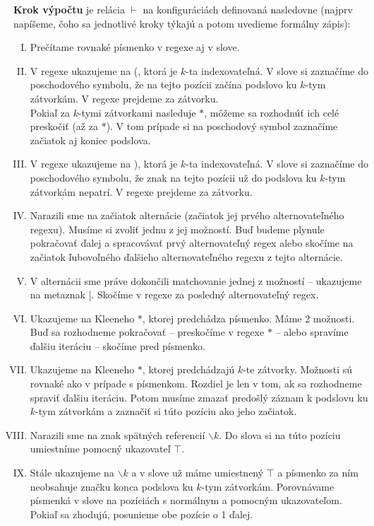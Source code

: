 \begin{df}
\textbf{Krok výpočtu} je relácia $\vdash$ na konfiguráciách definovaná nasledovne (najprv napíšeme, čoho sa jednotlivé kroky týkajú a potom uvedieme formálny zápis):

\begin{enumerate}[I.]
\item Prečítame rovnaké písmenko v regexe aj v slove.
\item V regexe ukazujeme na (, ktorá je $k$-ta indexovateľná. V slove si zaznačíme do poschodového symbolu, že na tejto pozícii začína podslovo ku $k$-tym zátvorkám. V regexe prejdeme za zátvorku.
\\ Pokiaľ za $k$-tymi zátvorkami nasleduje $*$, môžeme sa rozhodnúť ich celé preskočiť (až za $*$). V tom prípade si na poschodový symbol zaznačíme začiatok aj koniec podslova.
\item V regexe ukazujeme na ), ktorá je $k$-ta indexovateľná. V slove si zaznačíme do poschodového symbolu, že znak na tejto pozícii už do podslova ku $k$-tym zátvorkám nepatrí. V regexe prejdeme za zátvorku.
\item Narazili sme na začiatok alternácie (začiatok jej prvého alternovateľného regexu). Musíme si zvoliť jednu z jej možností. Buď budeme plynule pokračovať ďalej a spracovávať prvý alternovateľný regex alebo skočíme na začiatok ľubovoľného ďalšieho alternovateľného regexu z tejto alternácie.
\item V alternácii sme práve dokončili matchovanie jednej z možností -- ukazujeme na metaznak |. Skočíme v regexe za posledný alternovateľný regex.
\item Ukazujeme na Kleeneho $*$, ktorej predchádza písmenko. Máme 2 možnosti. Buď sa rozhodneme pokračovať -- preskočíme v regexe $*$ -- alebo spravíme ďalšiu iteráciu -- skočíme pred písmenko.
\item Ukazujeme na Kleeneho $*$, ktorej predchádzajú $k$-te zátvorky. Možnosti sú rovnaké ako v prípade s písmenkom. Rozdiel je len v tom, ak sa rozhodneme spraviť ďalšiu iteráciu. Potom musíme zmazať predošlý záznam k podslovu ku $k$-tym zátvorkám a zaznačiť si túto pozíciu ako jeho začiatok.
\item Narazili sme na znak spätných referencií $\backslash k$. Do slova si na túto pozíciu umiestníme pomocný ukazovateľ $\intercal$.
\item Stále ukazujeme na $\backslash k$ a v slove už máme umiestnený $\intercal$ a písmenko za ním neobsahuje značku konca podslova ku $k$-tym zátvorkám. Porovnávame písmenká v slove na pozíciách s normálnym a pomocným ukazovateľom. Pokiaľ sa zhodujú, posunieme obe pozície o 1 ďalej.

\end{enumerate}
\end{df}
